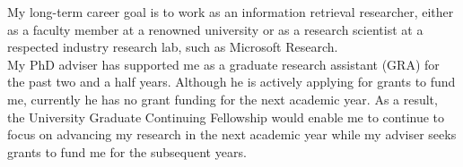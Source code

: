 \documentclass{article}
\begin{document}
 My long-term career goal is to work as an information retrieval researcher, either as a faculty member at a renowned university or as a research scientist at a respected industry research lab, such as Microsoft Research. \\


 My PhD adviser has supported me as a graduate research assistant (GRA) for the past two and a half years. Although he is actively applying for grants to fund me, currently he has no grant funding for the next academic year. As a result, the University Graduate Continuing Fellowship would enable me to continue to focus on advancing my research in the next academic year while my adviser seeks grants to fund me for the subsequent years.      

%
%



\end{document}
